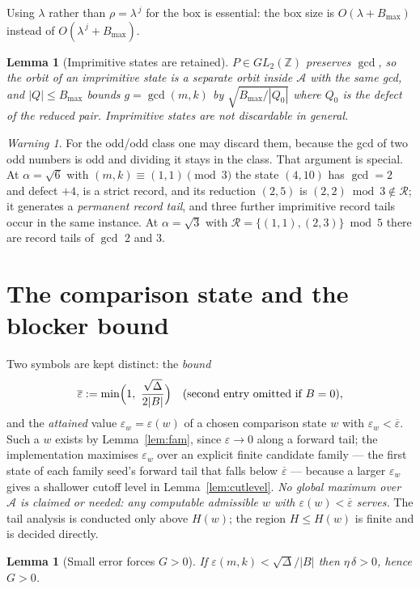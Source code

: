 \documentclass[11pt]{article}
\newtheorem{lemma}[theorem]{Lemma}
\theoremstyle{definition}
\theoremstyle{remark}
\newtheorem{warning}[theorem]{Warning}
\newcommand{\Z}{\mathbb{Z}}
\newcommand{\adm}{\mathcal{A}}
\newcommand{\dd}{\delta}
\newcommand{\epsbar}{\overline{\varepsilon}}
\newcommand{\epsw}{\varepsilon_w}
\begin{document}
Using $\lambda$ rather than $\rho=\lambda^{\,j}$ for the box is essential: the box size is
$O(\lambda+B_{\max})$ instead of $O(\lambda^{\,j}+B_{\max})$.

\begin{lemma}[Imprimitive states are retained]\label{lem:imprim}
$P\in GL_2(\Z)$ preserves $\gcd$, so the orbit of an imprimitive state is a separate orbit
inside $\adm$ with the same gcd, and $|Q|\le B_{\max}$ bounds $g=\gcd(m,k)$ by
$\sqrt{B_{\max}/|Q_0|}$ where $Q_0$ is the defect of the reduced pair. Imprimitive states are
\emph{not} discardable in general.
\end{lemma}

\begin{warning}\label{warn:imprim}
For the odd/odd class one may discard them, because the gcd of two odd numbers is odd and
dividing it stays in the class. That argument is special. At $\alpha=\sqrt6$ with
$(m,k)\equiv(1,1)\pmod3$ the state $(4,10)$ has $\gcd=2$ and defect $+4$, is a strict record,
and its reduction $(2,5)$ is $(2,2)\bmod3\notin\mathcal R$; it generates a \emph{permanent
record tail}, and three further imprimitive record tails occur in the same instance. At
$\alpha=\sqrt3$ with $\mathcal R=\{(1,1),(2,3)\}\bmod5$ there are record tails of $\gcd$ $2$
and $3$.
\end{warning}

\section{The comparison state and the blocker bound}\label{sec:eps0}

Two symbols are kept distinct: the \emph{bound}
\[
\epsbar:=\min\Bigl(1,\ \frac{\sqrt\Delta}{2|B|}\Bigr)\quad(\text{second entry omitted if }B=0),
\]
and the \emph{attained} value $\epsw=\varepsilon(w)$ of a chosen comparison state $w$ with
$\epsw<\epsbar$. Such a $w$ exists by Lemma~\ref{lem:fam}, since $\varepsilon\to0$ along a
forward tail; the implementation maximises $\epsw$ over an explicit finite candidate family ---
the first state of each family seed's forward tail that falls below $\epsbar$ --- because a
larger $\epsw$ gives a shallower cutoff level in Lemma~\ref{lem:cutlevel}. \emph{No global
maximum over $\adm$ is claimed or needed: any computable admissible $w$ with
$\varepsilon(w)<\epsbar$ serves.} The tail analysis is conducted only above $H(w)$; the region
$H\le H(w)$ is finite and is decided directly.

\begin{lemma}[Small error forces $G>0$]\label{lem:G}
If $\varepsilon(m,k)<\sqrt\Delta/|B|$ then $\eta\,\dd>0$, hence $G>0$.
\end{lemma}
\end{document}
